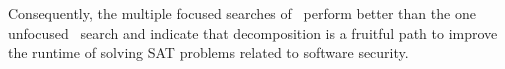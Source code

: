 \documentclass[
10pt, %
a4paper, %
oneside, %
headinclude,footinclude, %
BCOR5mm, %
]{scrartcl}
\begin{document}

Consequently, the multiple focused searches of \dagster\ perform better than the one unfocused \tinisat\ search and indicate that decomposition is a fruitful path to improve the runtime of solving SAT problems related to software security.
\end{document}
